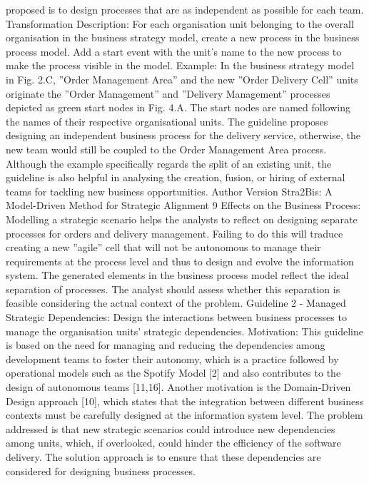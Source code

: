 proposed is to design processes that are as independent as possible for each team.
Transformation Description: For each organisation unit belonging to the
overall organisation in the business strategy model, create a new process in the
business process model. Add a start event with the unit’s name to the new
process to make the process visible in the model.
Example: In the business strategy model in Fig. 2.C, ”Order Management
Area” and the new ”Order Delivery Cell” units originate the ”Order Management” and ”Delivery Management” processes depicted as green start nodes in
Fig. 4.A. The start nodes are named following the names of their respective
organisational units. The guideline proposes designing an independent business
process for the delivery service, otherwise, the new team would still be coupled to
the Order Management Area process. Although the example specifically regards
the split of an existing unit, the guideline is also helpful in analysing the creation,
fusion, or hiring of external teams for tackling new business opportunities.
Author Version
Stra2Bis: A Model-Driven Method for Strategic Alignment 9
Effects on the Business Process: Modelling a strategic scenario helps
the analysts to reflect on designing separate processes for orders and delivery
management. Failing to do this will traduce creating a new ”agile” cell that
will not be autonomous to manage their requirements at the process level and
thus to design and evolve the information system. The generated elements in
the business process model reflect the ideal separation of processes. The analyst
should assess whether this separation is feasible considering the actual context
of the problem.
Guideline 2 - Managed Strategic Dependencies: Design the interactions
between business processes to manage the organisation units’ strategic dependencies.
Motivation: This guideline is based on the need for managing and reducing
the dependencies among development teams to foster their autonomy, which is
a practice followed by operational models such as the Spotify Model [2] and also
contributes to the design of autonomous teams [11,16]. Another motivation is the
Domain-Driven Design approach [10], which states that the integration between
different business contexts must be carefully designed at the information system
level. The problem addressed is that new strategic scenarios could introduce new
dependencies among units, which, if overlooked, could hinder the efficiency of
the software delivery. The solution approach is to ensure that these dependencies
are considered for designing business processes.

